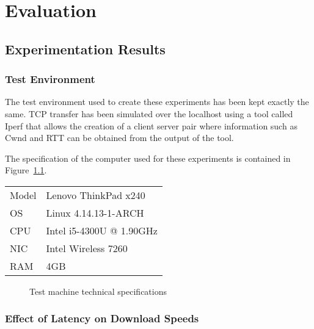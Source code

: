 \chapter{Evaluation}


\section{Experimentation Results}
\subsection{Test Environment}
The test environment used to create these experiments has been kept exactly the same. TCP transfer has been simulated over the localhost using a tool called Iperf \citep{gates2003iperf} that allows the creation of a client server pair where information such as Cwnd and RTT can be obtained from the output of the tool.

The specification of the computer used for these experiments is contained in Figure~\ref{ref:testmachine}.

\begin{center}
\begin{tabular}{| l | l |}
	\hline
	Model	& Lenovo ThinkPad x240			\\
	OS 		& Linux 4.14.13-1-ARCH			\\
	CPU 	& Intel i5-4300U @ 1.90GHz		\\
	NIC		& Intel Wireless 7260			\\
	RAM		& 4GB							\\
	\hline
\end{tabular}
\begin{figure}[h]
	\caption{Test machine technical specifications}
	\label{ref:testmachine}
\end{figure}
\end{center}

\clearpage
\subsection{Effect of Latency on Download Speeds}


